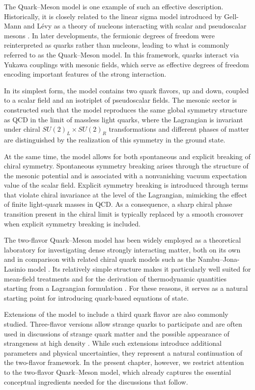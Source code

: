 The Quark--Meson model is one example of such an effective
description. Historically, it is closely related to the linear sigma
model introduced by Gell-Mann and Lévy as a theory of nucleons
interacting with scalar and pseudoscalar mesons
\cite{GellMannLevy1960}. In later developments, the fermionic degrees
of freedom were reinterpreted as quarks rather than nucleons, leading
to what is commonly referred to as the Quark--Meson model. In this
framework, quarks interact via Yukawa couplings with mesonic fields,
which serve as effective degrees of freedom encoding important
features of the strong interaction.

In its simplest form, the model contains two quark flavors, up and
down, coupled to a scalar field and an isotriplet of pseudoscalar
fields. The mesonic sector is constructed such that the model
reproduces the same global symmetry structure as QCD in the limit of
massless light quarks, where the Lagrangian is invariant under chiral
$SU(2)_L \times SU(2)_R$ transformations and different phases of
matter are distinguished by the realization of this symmetry in the
ground state.

At the same time, the model allows for both spontaneous and explicit
breaking of chiral symmetry. Spontaneous symmetry breaking arises
through the structure of the mesonic potential and is associated with
a nonvanishing vacuum expectation value of the scalar field. Explicit
symmetry breaking is introduced through terms that violate chiral
invariance at the level of the Lagrangian, mimicking the effect of
finite light-quark masses in QCD. As a consequence, a sharp chiral
phase transition present in the chiral limit is typically replaced by a smooth
crossover when explicit symmetry breaking is included.

The two-flavor Quark--Meson model has been widely employed as a
theoretical laboratory for investigating dense strongly interacting
matter, both on its own and in comparison with related chiral quark
models such as the Nambu--Jona-Lasinio model
\cite{Buballa2005}. Its relatively simple structure makes it
particularly well suited for mean-field treatments and for the
derivation of thermodynamic quantities starting from a Lagrangian
formulation \cite{SchaeferWambach2008}. For these reasons, it serves
as a natural starting point for introducing quark-based equations of
state.

Extensions of the model to include a third quark flavor are also
commonly studied. Three-flavor versions allow strange quarks to
participate and are often used in discussions of strange quark matter
and the possible appearance of strangeness at high density
\cite{SchaeferWambach2008,Buballa2005}. While such extensions introduce
additional parameters and physical uncertainties, they represent a
natural continuation of the two-flavor framework. In the present
chapter, however, we restrict attention to the two-flavor
Quark--Meson model, which already captures the essential conceptual
ingredients needed for the discussions that follow.


